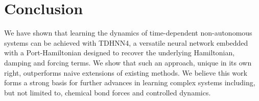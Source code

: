 \documentclass{article}
\begin{document}
\section{Conclusion}

We have shown that learning the dynamics of time-dependent non-autonomous systems can be achieved with TDHNN4, a versatile neural network embedded with a Port-Hamiltonian designed to recover the underlying Hamiltonian, damping and forcing terms. We show that such an approach, unique in its own right, outperforms naive extensions of existing methods. We believe this work forms a strong basis for further advances in learning complex systems including, but not limited to, chemical bond forces and controlled dynamics. 
\end{document}

